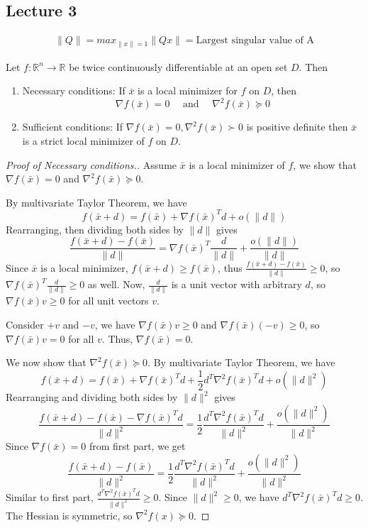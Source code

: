 
% 
\subsection{Lecture 3}

\begin{definition}
    \begin{align*}
        \|Q\|=max_{\|x\|=1}\|Qx\|= \text{Largest singular value of A}
    \end{align*}
\end{definition}

\begin{theorem}
  Let $f: \mathbb R^n \to \mathbb R$ be twice continuously differentiable at an open set $D$. Then
  \begin{enumerate}
    \item Necessary conditions: If $\bar{x}$ is a local minimizer for $f$ on $D$, then $$\nabla f(\bar{x})=0 \quad \text{ and } \quad \nabla^2f(\bar{x}) \succeq 0
    $$
    \item Sufficient conditions: If $\nabla f(\bar{x})=0,\nabla^2f(\bar{x}) \succ 0$ is positive definite then $\bar{x}$ is a strict local minimizer of $f$ on $D$.
  \end{enumerate}
\end{theorem}
\begin{proof}[Proof of Necessary conditions.]
  Assume $\bar x$ is a local minimizer of $f$, we show that $\nabla f(\bar x) = 0$ and $\nabla^2 f(\bar x) \succeq 0$.
    
  By multivariate Taylor Theorem, we have
  $$f(\bar x + d) = f(\bar x) + \nabla f(\bar x)^Td + o(\|d\|)$$
  Rearranging, then dividing both sides by $\|d\|$ gives
  $$\frac{f(\bar x + d) - f(\bar x)}{\| d\|} = \nabla f(\bar x)^T \frac{d}{\|d\|} + \frac{o(\|d\|)}{\|d\|}$$
  Since $\bar x$ is a local minimizer, $f(\bar x + d) \geq f(\bar x)$, thus $\frac{f(\bar x + d) - f(\bar x)}{\|d\|} \geq 0$, so $\nabla f(\bar x)^T \frac{d}{\| d\|} \geq 0$ as well. Now, $\frac{d}{\|d\|}$ is a unit vector with arbitrary $d$, so $\nabla f(\bar x) v \geq 0$ for all unit vectors $v$.

  Consider $+v$ and $-v$, we have $\nabla f(\bar x) v \geq 0$ and $\nabla f(\bar x) (-v) \geq 0$, so $\nabla f(\bar x) v = 0$ for all $v$. Thus, $\nabla f(\bar x) = 0$.

  \bigskip
  We now show that $\nabla^2 f(\bar x) \succeq 0$. By multivariate Taylor Theorem, we have
  $$f(\bar x + d) = f(\bar x) + \nabla f(\bar x)^T d + \frac{1}{2}d^T \nabla^2 f(\bar x)^T d + o(\|d\|^2)$$
  Rearranging and dividing both sides by $\|d\|^2$ gives
  $$\frac{f(\bar x + d) - f(\bar x) -  \nabla f(\bar x)^T d}{\|d\|^2} = \frac{1}{2}\frac{d^T \nabla^2 f(\bar x)^T d}{\|d\|^2} + \frac{o(\|d\|^2)}{\|d\|^2}$$
  Since $\nabla f(\bar x) = 0$ from first part, we get
  $$\frac{f(\bar x + d) - f(\bar x)}{\|d\|^2} = \frac{1}{2}\frac{d^T \nabla^2 f(\bar x)^T d}{\|d\|^2} + \frac{o(\|d\|^2)}{\|d\|^2}$$
  Similar to first part, $\frac{d^T \nabla^2 f(\bar x)^T d}{\|d\|^2} \geq 0$. Since $\|d\|^2 \geq 0$, we have $d^T \nabla^2 f(\bar x)^T d \geq 0$. The Hessian is symmetric, so $\nabla^2 f(x) \succeq 0$.
\end{proof}
